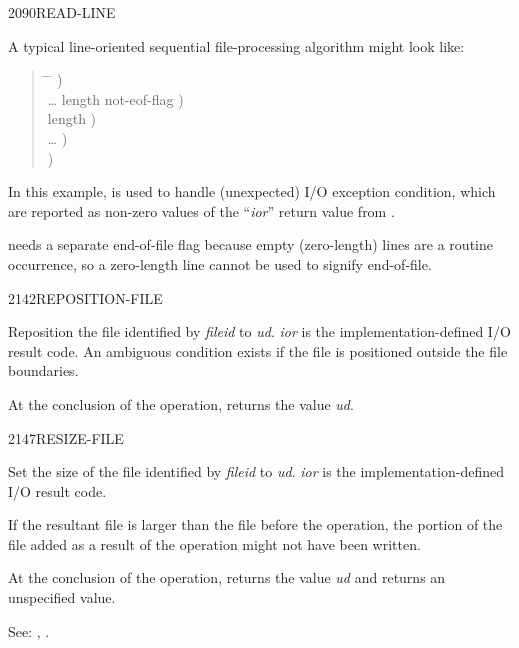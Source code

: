 \begin{newword}{2090}{READ-LINE}
\begin{rationale}
		A typical line-oriented sequential file-processing algorithm
		might look like:

		\begin{quote}\ttfamily{}
		  \begin{tabbing}
			\tab \= \hspace{12em} \= \kill
							\>\>  ) \\
			\> {\ldots}  
										\>	 \word{p} length not-eof-flag ) \\
			 				\>\>  length ) \\
			\> {\ldots}					\>	  ) \\
			 	\>	  ) \\
		  \end{tabbing}
		\end{quote}

		In this example,  is used to handle
		(unexpected) I/O exception condition, which are reported as
		non-zero values of the ``\emph{ior}'' return value from
		.

		 needs a separate end-of-file flag because
		empty (zero-length) lines are a routine occurrence, so a
		zero-length line cannot be used to signify end-of-file.
	\end{rationale}
\end{newword}


\begin{newword}{2142}{REPOSITION-FILE}

	Reposition the file identified by \emph{fileid} to \emph{ud}.
	\emph{ior} is the implementation-defined I/O result code. An
	ambiguous condition exists if the file is positioned outside
	the file boundaries.

	At the conclusion of the operation, 
	returns the value \emph{ud}.
\end{newword}


\begin{newword}{2147}{RESIZE-FILE}

	Set the size of the file identified by \emph{fileid} to
	\emph{ud}. \emph{ior} is the implementation-defined I/O result
	code.

	If the resultant file is larger than the file before the
	operation, the portion of the file added as a result of the
	operation might not have been written.

	At the conclusion of the operation,  returns
	the value \emph{ud} and  returns an
	unspecified value.

\item[See:]
	,
	.
\end{newword}


